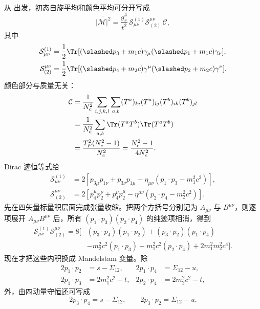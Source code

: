 \begin{derivation}[不同味夸克散射的自旋与颜色平均]
从 出发，初态自旋平均和颜色平均可分开写成
\begin{equation*}
 \overline{|\mathcal M|^2}
 =\frac{g_s^4}{t^2}\,
 \mathcal S_{\mu\nu}^{(1)}\mathcal S_{(2)}^{\mu\nu}\,\mathcal C,
\end{equation*}
其中
\begin{align*}
 \mathcal S_{\mu\nu}^{(1)}
 &=\frac12\Tr[(\slashed p_3+m_1c)\gamma_\mu(\slashed p_1+m_1c)\gamma_\nu],\\
 \mathcal S_{(2)}^{\mu\nu}
 &=\frac12\Tr[(\slashed p_4+m_2c)\gamma^\mu(\slashed p_2+m_2c)\gamma^\nu].
\end{align*}
颜色部分与质量无关：
\begin{align*}
 \mathcal C
 &=\frac1{N_c^2}\sum_{i,j,k,l}\sum_{a,b}
 (T^a)_{ki}(T^a)_{lj}(T^b)_{ik}(T^b)_{jl}\\
 &=\frac1{N_c^2}\sum_{a,b}\Tr(T^aT^b)\Tr(T^aT^b)\\
 &=\frac{T_F^2(N_c^2-1)}{N_c^2}
 =\frac{N_c^2-1}{4N_c^2}.
\end{align*}
Dirac 迹恒等式给
\begin{align*}
 \mathcal S_{\mu\nu}^{(1)}
 &=2\left[p_{3\mu}p_{1\nu}+p_{3\nu}p_{1\mu}
 -\eta_{\mu\nu}(p_1\!\cdot p_3-m_1^2c^2)\right],\\
 \mathcal S_{(2)}^{\mu\nu}
 &=2\left[p_4^{\mu}p_2^{\nu}+p_4^{\nu}p_2^{\mu}
 -\eta^{\mu\nu}(p_2\!\cdot p_4-m_2^2c^2)\right].
\end{align*}
先在四矢量标量积层面完成张量收缩。把两个方括号分别记为 $A_{\mu\nu}$ 与 $B^{\mu\nu}$，则逐项展开 $A_{\mu\nu}B^{\mu\nu}$ 后，所有
$(p_1\!\cdot p_3)(p_2\!\cdot p_4)$ 的纯迹项相消，得到
\begin{align*}
\mathcal S_{\mu\nu}^{(1)}\mathcal S_{(2)}^{\mu\nu}
=8\Big[&
(p_3\!\cdot p_4)(p_1\!\cdot p_2)
+(p_3\!\cdot p_2)(p_1\!\cdot p_4)\\
&-m_2^2c^2(p_1\!\cdot p_3)
-m_1^2c^2(p_2\!\cdot p_4)
+2m_1^2m_2^2c^4\Big].
\end{align*}
现在才把这些内积换成 Mandelstam 变量。除
\begin{align*}
 2p_1\!\cdot p_2&=s-\Sigma_{12},
&2p_1\!\cdot p_4&=\Sigma_{12}-u,\\
 2p_1\!\cdot p_3&=2m_1^2c^2-t,
&2p_2\!\cdot p_4&=2m_2^2c^2-t,
\end{align*}
外，由四动量守恒还可写成
\begin{equation*}
2p_3\!\cdot p_4=s-\Sigma_{12},
\qquad
2p_3\!\cdot p_2=\Sigma_{12}-u.
\end{equation*}

\end{derivation}
